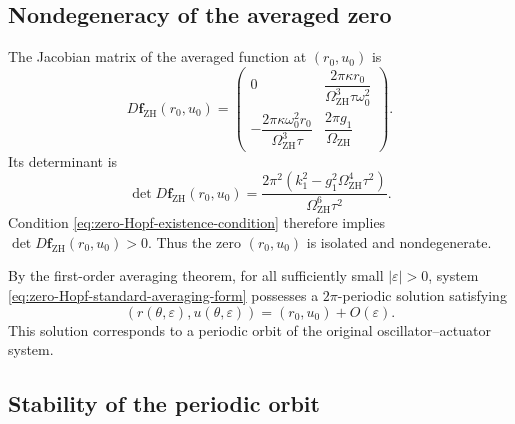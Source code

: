 \documentclass[11pt,reqno]{amsart}
\theoremstyle{plain}
\theoremstyle{definition}
\theoremstyle{remark}
\begin{document}
\subsection{Nondegeneracy of the averaged zero}
\label{subsec:zero-Hopf-nondegeneracy}

The Jacobian matrix of the averaged function at \((r_0,u_0)\) is
\begin{equation}
\label{eq:zero-Hopf-averaged-Jacobian}
D\mathbf f_{\mathrm{ZH}}(r_0,u_0)
=
\begin{pmatrix}
0
&
\dfrac{
2\pi\kappa r_0
}{
\Omega_{\mathrm{ZH}}^3\tau\omega_0^2
}
\\[5mm]
-\dfrac{
2\pi\kappa\omega_0^2r_0
}{
\Omega_{\mathrm{ZH}}^3\tau
}
&
\dfrac{
2\pi g_1
}{
\Omega_{\mathrm{ZH}}
}
\end{pmatrix}.
\end{equation}
Its determinant is
\begin{equation}
\label{eq:zero-Hopf-averaged-Jacobian-determinant}
\det D\mathbf f_{\mathrm{ZH}}(r_0,u_0)
=
\frac{
2\pi^2
\left(
k_1^2
-
g_1^2\Omega_{\mathrm{ZH}}^4\tau^2
\right)
}{
\Omega_{\mathrm{ZH}}^6\tau^2
}.
\end{equation}
Condition \eqref{eq:zero-Hopf-existence-condition} therefore implies
$
\det D\mathbf f_{\mathrm{ZH}}(r_0,u_0)>0.
$
Thus the zero \((r_0,u_0)\) is isolated and nondegenerate.

By the first-order averaging theorem, for all sufficiently small
\(|\varepsilon|>0\), system
\eqref{eq:zero-Hopf-standard-averaging-form} possesses a
\(2\pi\)-periodic solution satisfying
\begin{equation}
\label{eq:zero-Hopf-periodic-reduced}
(r(\theta,\varepsilon),u(\theta,\varepsilon))
=
(r_0,u_0)+O(\varepsilon).
\end{equation}
This solution corresponds to a periodic orbit of the original
oscillator--actuator system.

\subsection{Stability of the periodic orbit}
\label{subsec:zero-Hopf-stability}
\end{document}
